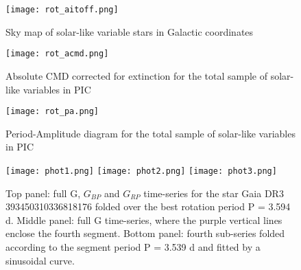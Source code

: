 \begin{figure}[H]
\centering
\texttt{[image: rot\_aitoff.png]}
\caption{Sky map of solar-like variable stars in Galactic coordinates }
\label{fig:All-sky map of solar-like variables}
\end{figure}


\begin{comment}
\begin{figure}[H]
\centering
\texttt{[image: rot\_cmd.png]}
\caption{Absolute CMD corrected for extinction for the solar-like variables in LOPN1}
\label{fig:Absolute CMD corrected for extinction for the solar-like variables in LOPN1}
\end{figure}


\begin{figure}[H]
\centering
\texttt{[image: rot2\_cmd.png]}
\caption{Absolute CMD corrected for extinction for the solar-like variables in LOPS2}
\label{fig:Absolute CMD corrected for extinction for the solar-like variables in LOPS2}
\end{figure}
\end{comment}

\begin{figure}[H]
\centering
\texttt{[image: rot\_acmd.png]}
\caption{Absolute CMD corrected for extinction for the total sample of solar-like variables in PIC}
\label{fig:Absolute CMD}
\end{figure}


\begin{figure}[H]
\centering
\texttt{[image: rot\_pa.png]}
\caption{Period-Amplitude diagram for the total sample of solar-like variables in PIC}
\label{fig:rot_pa.png}
\end{figure}


\begin{figure}[H]
\centering
\texttt{[image: phot1.png]}
\texttt{[image: phot2.png]}
\texttt{[image: phot3.png]}
\caption{Top panel: full G, $G_{BP}$ and $G_{RP}$ time-series for the star Gaia DR3 393450310336818176 folded over the best rotation period P =  3.594 d.
Middle panel: full G time-series, where the purple vertical lines enclose the fourth segment.
Bottom panel: fourth sub-series folded according to the segment period P = 3.539 d and fitted by a sinusoidal curve.}
\label{fig:rotation_modulation}
\end{figure}





